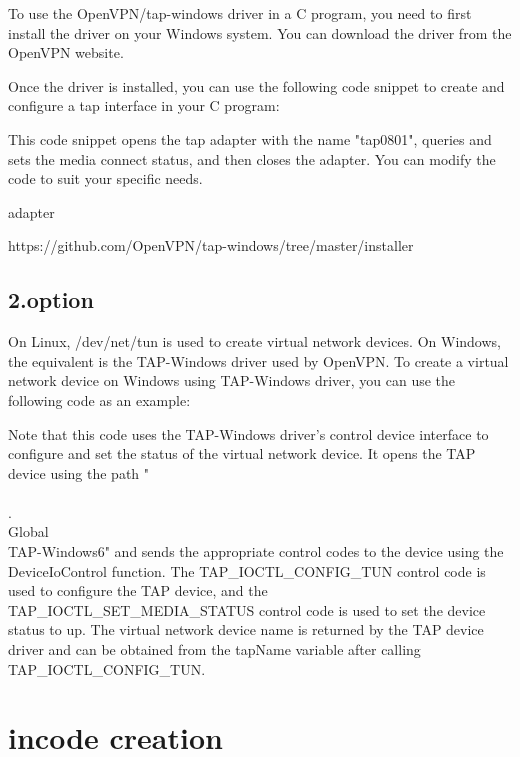 To use the OpenVPN/tap-windows driver in a C program, you need to first install the driver on your Windows system. You can download the driver from the OpenVPN website.

Once the driver is installed, you can use the following code snippet to create and configure a tap interface in your C program:

This code snippet opens the tap adapter with the name "tap0801", queries and sets the media connect status, and then closes the adapter. You can modify the code to suit your specific needs.

adapter

 https://github.com/OpenVPN/tap-windows/tree/master/installer
 \subsection{2.option}
 On Linux, /dev/net/tun is used to create virtual network devices. On Windows, the equivalent is the TAP-Windows driver used by OpenVPN. To create a virtual network device on Windows using TAP-Windows driver, you can use the following code as an example:
 

 Note that this code uses the TAP-Windows driver's control device interface to configure and set the status of the virtual network device. It opens the TAP device using the path "\\\\.\\Global\\TAP-Windows6" and sends the appropriate control codes to the device using the DeviceIoControl function. The TAP\_IOCTL\_CONFIG\_TUN control code is used to configure the TAP device, and the TAP\_IOCTL\_SET\_MEDIA\_STATUS control code is used to set the device status to up. The virtual network device name is returned by the TAP device driver and can be obtained from the tapName variable after calling TAP\_IOCTL\_CONFIG\_TUN.
\section{incode creation }